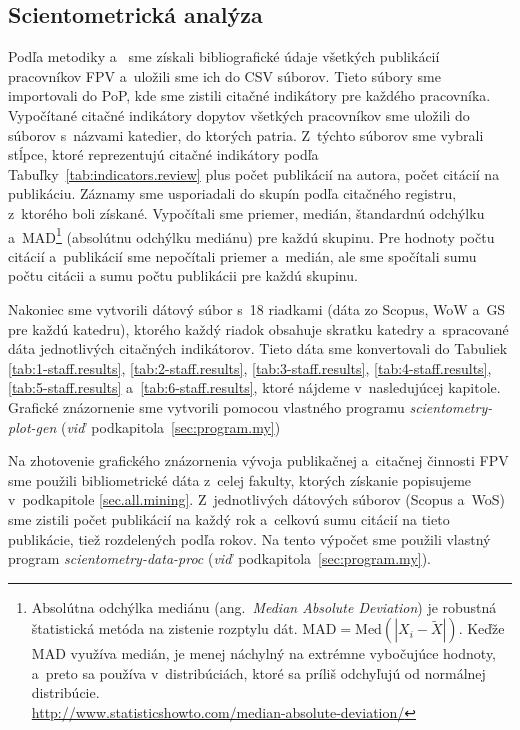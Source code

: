 \subsection{Scientometrická analýza}

Podľa metodiky \citet{Kazakis2014a} a~\citet{Kazakis2014b,Kazakis2015} sme
získali bibliografické údaje všetkých publikácií pracovníkov FPV a~uložili sme
ich do CSV súborov.  Tieto súbory sme importovali do PoP, kde sme zistili
citačné indikátory pre každého pracovníka.  Vypočítané citačné indikátory
dopytov všetkých pracovníkov sme uložili do súborov s~názvami katedier, do
ktorých patria.  Z~týchto súborov sme vybrali stĺpce, ktoré reprezentujú citačné
indikátory podľa Tabuľky~\ref{tab:indicators.review} plus počet publikácií na
autora, počet citácií na publikáciu.  Záznamy sme usporiadali do skupín podľa
citačného registru, z~ktorého boli získané.  Vypočítali sme priemer, medián,
štandardnú odchýlku a~MAD\footnote{Absolútna odchýlka mediánu
  (ang.~\emph{Median Absolute Deviation}) je robustná štatistická metóda na
  zistenie rozptylu dát.  $\mathrm{MAD} = \mathrm{Med}(|X_i - \tilde{X}|)$.
  Keďže MAD využíva medián, je menej náchylný na extrémne vybočujúce hodnoty,
  a~preto sa používa v~distribúciách, ktoré sa príliš odchyľujú od normálnej
  distribúcie.\\\url{http://www.statisticshowto.com/median-absolute-deviation/}}
(absolútnu odchýlku mediánu) pre každú skupinu.  Pre hodnoty počtu citácií
a~publikácií sme nepočítali priemer a~medián, ale sme spočítali sumu počtu citácii
a sumu počtu publikácii pre každú skupinu.

Nakoniec sme vytvorili dátový súbor s~18 riadkami (dáta zo Scopus, WoW a~GS pre
každú katedru), ktorého každý riadok obsahuje skratku katedry a~spracované dáta
jednotlivých citačných indikátorov.  Tieto dáta sme konvertovali do Tabuliek
\ref{tab:1-staff.results}, \ref{tab:2-staff.results}, \ref{tab:3-staff.results},
\ref{tab:4-staff.results}, \ref{tab:5-staff.results}
a~\ref{tab:6-staff.results}, ktoré nájdeme v~nasledujúcej kapitole.  Grafické
znázornenie sme vytvorili pomocou vlastného programu
\emph{scientometry-plot-gen} (\emph{viď}~podkapitola~\ref{sec:program.my})

Na zhotovenie grafického znázornenia vývoja publikačnej a~citačnej činnosti FPV
sme použili bibliometrické dáta z~celej fakulty, ktorých získanie popisujeme
v~podkapitole \ref{sec.all.mining}.  Z~jednotlivých dátových súborov (Scopus
a~WoS) sme zistili počet publikácií na každý rok a~celkovú sumu citácií na tieto
publikácie, tiež rozdelených podľa rokov.  Na tento výpočet sme použili vlastný
program \emph{scientometry-data-proc}
(\emph{viď}~podkapitola~\ref{sec:program.my}).


